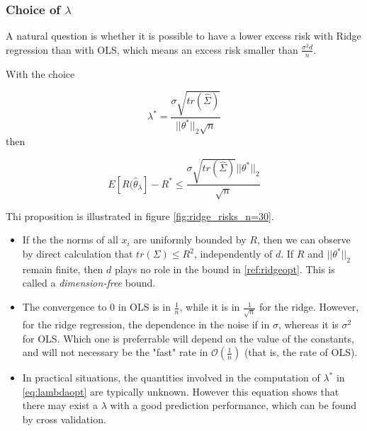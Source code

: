 \documentclass[
10pt, %
a4paper, %
oneside, %
headinclude,footinclude, %
BCOR5mm, %
]{scrartcl}
\begin{document}
\subsubsection{\large\color{Periwinkle}Choice of $\lambda$}

A natural question is whether it is possible to have a lower excess risk with Ridge regression than with OLS, which means an excess risk smaller than $ \frac{\sigma^2d}{n} $.

\begin{proposition}
    With the choice 

    \begin{equation}
	\label{eq:lambdaopt}
	\lambda^* = \frac{\sigma \sqrt{tr( \hat{\Sigma})}}{||\theta^*||_2 \sqrt{n} } 
    \end{equation}
    then

    \begin{equation}
	\label{ref:ridgeopt}
	E[ R( \hat{\theta}_{\lambda}]-R^*\leq \frac{\sigma \sqrt{tr( \hat{\Sigma})}||\theta^*||_2 }{ \sqrt{n} } 
    \end{equation}
\end{proposition}

Thi proposition is illustrated in figure \ref{fig:ridge_risks_n=30}.

\begin{itemize}
    \item If the the norms of all $x_i$ are uniformly bounded by $R$, then we can observe by direct calculation that $tr( \Sigma)\leq R^2$, independently of $d$. If $R$ and $||\theta^*||_2$ remain finite, then $d$ plays no role in  the bound in \ref{ref:ridgeopt}. This is called a \textit{{dimension-free}} bound.
    \item The convergence to $0$ in OLS is in $ \frac{1}{n} $, while it is  in $ \frac{1}{ \sqrt{n} }$ for the ridge. However, for the ridge regression, the dependence in the noise if in $\sigma$, whereas it is $\sigma^2$ for OLS. Which one is preferrable will depend on the value of the constants, and will not necessary be the "fast" rate in $ \mathcal{O} ( \frac{1}{n} )$ (that is, the rate of OLS).
    \item In practical situations, the quantities involved in the computation
        of $\lambda^*$ in  \ref{eq:lambdaopt} are typically unknown. However
        this equation shows that there may exist a $\lambda$ with a good prediction performance, which can be found by cross validation.
\end{itemize}
\end{document}
